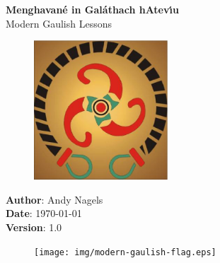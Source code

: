 \begin{titlepage}
  \thispagestyle{empty} %
  \vspace*{\fill}

  \begin{center}
    \textbf{\Huge Menghavan\'{e} in Gal\'{a}thach hAtev\'{\i}u}\\
    {\huge Modern Gaulish Lessons}\\
    
    \vspace{\fill}

    \begin{figure}[H]
    \centering
    \includegraphics[width=5.0cm]{img/modern-gaulish-logo.eps}
    \end{figure}

    \noindent \textbf{Author}: Andy Nagels\\
    \noindent \textbf{Date}: \today\\
    \noindent \textbf{Version}: 1.0\\

    \begin{figure}[H]
    \centering
    \texttt{[image: img/modern-gaulish-flag.eps]}
    \end{figure}
    
    \vspace{\fill}

  \end{center}
  \vspace*{\fill}

\end{titlepage}

